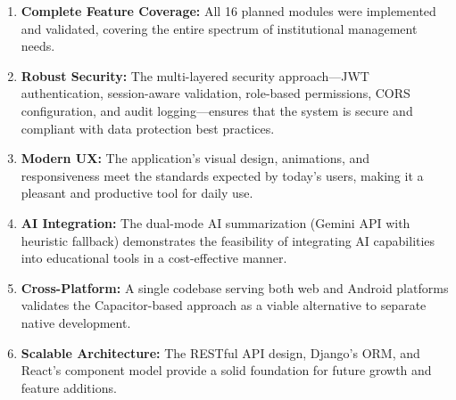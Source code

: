 \begin{enumerate}[label=\arabic*., leftmargin=2em]
    \item \textbf{Complete Feature Coverage:} All 16 planned modules were implemented and validated, covering the entire spectrum of institutional management needs.
    
    \item \textbf{Robust Security:} The multi-layered security approach---JWT authentication, session-aware validation, role-based permissions, CORS configuration, and audit logging---ensures that the system is secure and compliant with data protection best practices.
    
    \item \textbf{Modern UX:} The application's visual design, animations, and responsiveness meet the standards expected by today's users, making it a pleasant and productive tool for daily use.
    
    \item \textbf{AI Integration:} The dual-mode AI summarization (Gemini API with heuristic fallback) demonstrates the feasibility of integrating AI capabilities into educational tools in a cost-effective manner.
    
    \item \textbf{Cross-Platform:} A single codebase serving both web and Android platforms validates the Capacitor-based approach as a viable alternative to separate native development.
    
    \item \textbf{Scalable Architecture:} The RESTful API design, Django's ORM, and React's component model provide a solid foundation for future growth and feature additions.
\end{enumerate}